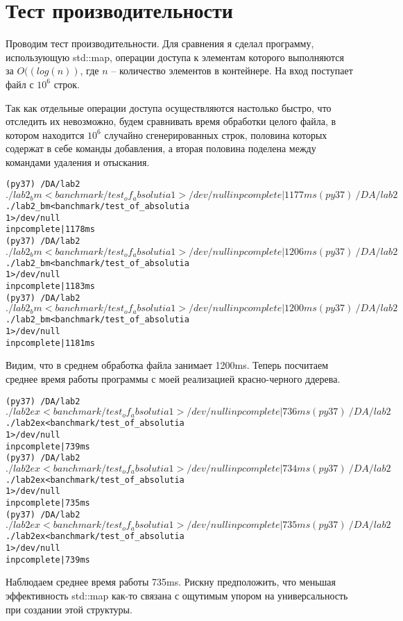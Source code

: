 \section{Тест производительности}

Проводим тест производительности. Для сравнения я сделал программу, использующую std::map, операции доступа к элементам которого выполняются за $O((log(n))$,
где $n$ – количество элементов в контейнере. На вход поступает файл с $10^6$ строк.

Так как отдельные операции доступа осуществляются настолько быстро, что отследить их невозможно, будем сравнивать время обработки целого файла, в котором
находится $10^6$ случайно сгенерированных строк, половина которых содержат в
себе команды добавления, а вторая половина поделена между командами удаления и отыскания.

\begin{alltt}
(py37) ~ /DA/lab2$ ./lab2_bm <banchmark/test_of_absolutia
1>/dev/null
inp complete| 1177ms
(py37) ~ /DA/lab2$ ./lab2_bm <banchmark/test_of_absolutia
1>/dev/null
inp complete| 1178ms
(py37) ~ /DA/lab2$ ./lab2_bm <banchmark/test_of_absolutia
1>/dev/null
inp complete| 1206ms
(py37) ~ /DA/lab2$ ./lab2_bm <banchmark/test_of_absolutia
1>/dev/null
inp complete| 1183ms
(py37) ~ /DA/lab2$ ./lab2_bm <banchmark/test_of_absolutia
1>/dev/null
inp complete| 1200ms
(py37) ~ /DA/lab2$ ./lab2_bm <banchmark/test_of_absolutia
1>/dev/null
inp complete| 1181ms
\end{alltt}

Видим, что в среднем обработка файла занимает 1200ms. Теперь посчитаем среднее время работы программы с моей реализацией красно-черного ддерева.

\begin{alltt}
(py37) ~ /DA/lab2$ ./lab2ex <banchmark/test_of_absolutia
1>/dev/null
inp complete| 736ms
(py37) ~ /DA/lab2$ ./lab2ex <banchmark/test_of_absolutia
1>/dev/null
inp complete| 739ms
(py37) ~ /DA/lab2$ ./lab2ex <banchmark/test_of_absolutia
1>/dev/null
inp complete| 734ms
(py37) ~ /DA/lab2$ ./lab2ex <banchmark/test_of_absolutia
1>/dev/null
inp complete| 735ms
(py37) ~ /DA/lab2$ ./lab2ex <banchmark/test_of_absolutia
1>/dev/null
inp complete| 735ms
(py37) ~ /DA/lab2$ ./lab2ex <banchmark/test_of_absolutia
1>/dev/null
inp complete| 739ms
\end{alltt}

Наблюдаем среднее время работы 735ms. Рискну предположить, что меньшая эффективность std::map как-то связана с ощутимым упором на универсальность при
создании этой структуры.

\pagebreak

